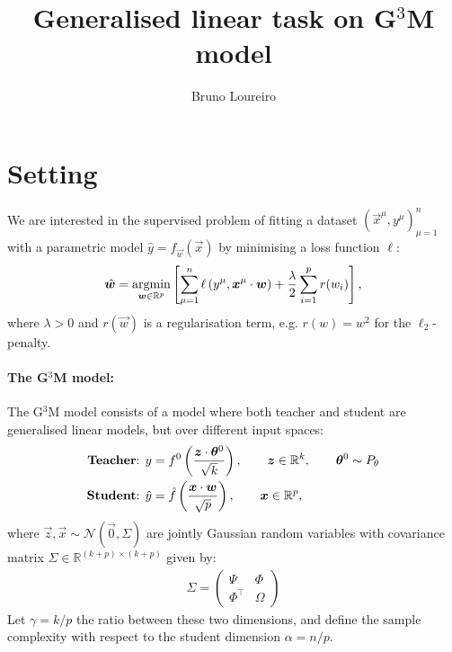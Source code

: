 \documentclass[11pt]{article}
\title{Generalised linear task on G$^3$M model}
\author{Bruno Loureiro}
\numberwithin{equation}{section}
\begin{document}
\maketitle
\tableofcontents

\section{Setting}
\label{sec:setting}
We are interested in the supervised problem of fitting a dataset $(\vec{x}^{\mu}, y^{\mu})_{\mu=1}^{n}$ with a parametric model $\hat{y} = f_{\vec{w}}(\vec{x})$ by minimising a loss function $\ell$:
\begin{align}
\hat{\vec{w}} = \underset{\vec{w}\in\mathbb{R}^{p}}{\argmin}\left[\sum\limits_{\mu=1}^{n}\ell\left(y^{\mu},\vec{x}^{\mu}\cdot \vec{w}\right)+\frac{\lambda}{2}\sum\limits_{i=1}^{p}r(w_{i})\right],
\label{eq:argmin}
\end{align}
\noindent where $\lambda>0$ and $r(\vec{w})$ is a regularisation term, e.g. $r(w) = w^2$ for the $\ell_2$-penalty.

\paragraph{The G$^3$M model:} The G$^3$M model consists of a model where both teacher and student are generalised linear models, but over different input spaces:
\begin{align}
\text{\textbf{Teacher}: } y &= f^{0}\left(\frac{\vec{z}\cdot \vec{\theta}^{0}}{\sqrt{k}}\right), \qquad \vec{z}\in\mathbb{R}^{k}, \qquad \vec{\theta}^{0}\sim P_{\theta} \\
\text{\textbf{Student}: }  \hat{y} &= \hat{f}\left(\frac{\vec{x}\cdot \vec{w}}{\sqrt{p}}\right), \qquad \vec{x}\in\mathbb{R}^{p}, 
\end{align}
\noindent where $\vec{z},\vec{x} \sim\mathcal{N}(\vec{0},\Sigma)$ are jointly Gaussian random variables with covariance matrix $\Sigma\in\mathbb{R}^{(k+p)\times(k+p)}$ given by:
\begin{align}
\Sigma = \begin{pmatrix}
 \Psi & \Phi\\
 \Phi^{\top} & \Omega	
 \end{pmatrix}
\end{align}
Let $\gamma = k/p$ the ratio between these two dimensions, and define the sample complexity with respect to the student dimension $\alpha = n/p$.

\end{document}
